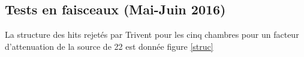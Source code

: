 \subsection{Tests en faisceaux (Mai-Juin 2016)}
La structure des hits rejetés par Trivent pour les cinq chambres pour un facteur d'attenuation de la source de \num{22} est donnée figure \ref{struc}
\begin{figure}[ht!]
	\centering
	\hfill
	\\
	\vspace{0.4cm}
	\hfill
	\\
	\vspace{0.4cm}

\end{figure}
